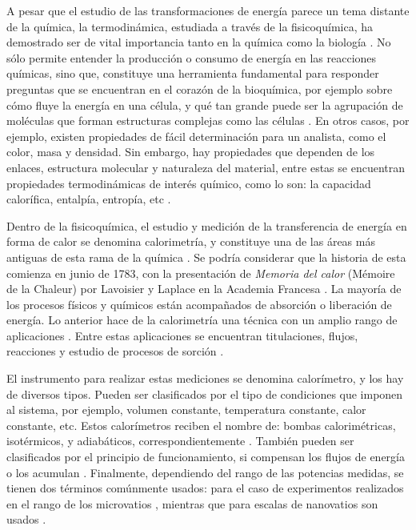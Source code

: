 	A pesar que el estudio de las transformaciones de energía parece un tema distante de la química, la termodinámica, estudiada a través de la fisicoquímica, ha demostrado ser de vital importancia tanto en la química como la biología \cite{atkins2011physical}. No sólo permite entender la producción o consumo de energía en las reacciones químicas, sino que, constituye una herramienta fundamental para responder preguntas que se encuentran en el corazón de la bioquímica, por ejemplo sobre cómo fluye la energía en una célula, y qué tan grande puede ser la agrupación de moléculas que forman estructuras complejas como las células \cite{atkins2011physical}. En otros casos, por ejemplo, existen propiedades de fácil determinación para un analista, como el color, masa y densidad. Sin embargo, hay propiedades que dependen de los enlaces, estructura molecular y naturaleza del material, entre estas se encuentran propiedades termodinámicas de interés químico, como lo son: la capacidad calorífica, entalpía, entropía, etc \cite{gaisford2016principles}.
	
	Dentro de la fisicoquímica, el estudio y medición de la transferencia de energía en forma de calor se denomina calorimetría, y constituye una de las áreas más antiguas de esta rama de la química \cite{zielenkiewicz2006theory}. Se podría considerar que la historia de esta comienza en junio de 1783, con la presentación de \textit{Memoria del calor} (Mémoire de la Chaleur) por Lavoisier y Laplace en la Academia Francesa \cite{zielenkiewicz2006theory}. La mayoría de los procesos físicos y químicos están acompañados de absorción o liberación de energía. Lo anterior hace de la calorimetría una técnica con un amplio rango de aplicaciones \cite{wadso2001standards}. Entre estas aplicaciones se encuentran titulaciones, flujos, reacciones y estudio de procesos de sorción \cite{gaisford2016principles}.
		
	El instrumento para realizar estas mediciones se denomina calorímetro, y los hay de diversos tipos. Pueden ser clasificados por el tipo de condiciones que imponen al sistema, por ejemplo, volumen constante, temperatura constante, calor constante, etc. Estos calorímetros reciben el nombre de: bombas calorimétricas, isotérmicos, y adiabáticos, correspondientemente \cite{gaisford2016principles, wadso2001standards}. También pueden ser clasificados por el principio de funcionamiento, si compensan los flujos de energía o los acumulan \cite{gaisford2016principles}. Finalmente, dependiendo del rango de las potencias medidas, se tienen dos términos comúnmente usados:  para el caso de experimentos realizados en el rango de los microvatios \cite{wadso2001standards, wadso2003new}, mientras que para escalas de nanovatios son usados  \cite{wadso2003new}.
	
